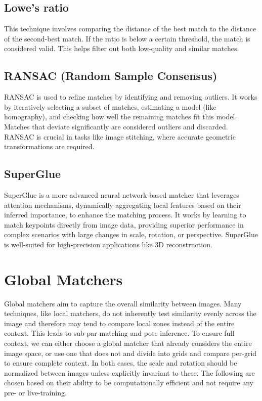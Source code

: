 \subsection*{Lowe's ratio}
This technique involves comparing the distance of the best match to the distance of the second-best match. If the ratio is below a certain threshold, the match is considered valid. This helps filter out both low-quality and similar matches. 

\subsection*{RANSAC (Random Sample Consensus)} RANSAC is used to refine matches by identifying and removing outliers. It works by iteratively selecting a subset of matches, estimating a model (like homography), and checking how well the remaining matches fit this model. Matches that deviate significantly are considered outliers and discarded. RANSAC is crucial in tasks like image stitching, where accurate geometric transformations are required.


\subsection*{SuperGlue} SuperGlue is a more advanced neural network-based matcher that leverages attention mechanisms, dynamically aggregating local features based on their inferred importance, to enhance the matching process. It works by learning to match keypoints directly from image data, providing superior performance in complex scenarios with large changes in scale, rotation, or perspective. SuperGlue is well-suited for high-precision applications like 3D reconstruction. 


\section*{Global Matchers}

Global matchers aim to capture the overall similarity between images. Many techniques, like local matchers, do not inherently test similarity evenly across the image and therefore may tend to compare local zones instead of the entire context. This leads to sub-par matching and pose inference. 
To ensure full context, we can either choose a global matcher that already considers the entire image space, or use one that does not and divide into grids and compare per-grid to ensure complete context. In both cases, the scale and rotation should be normalized between images unless explicitly invariant to these. 
The following are chosen based on their ability to be computationally efficient and not require any pre- or live-training.

